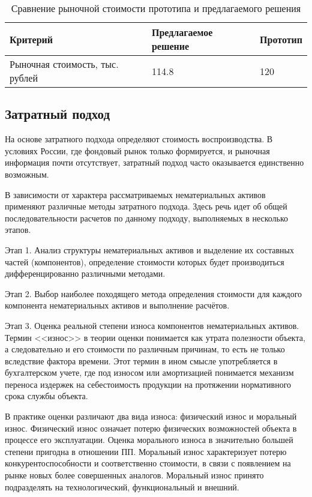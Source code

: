 \begin{table}[H]
\centering
\caption{Сравнение рыночной стоимости прототипа и предлагаемого решения}
{\small 
\begin{tabu}to \textwidth{ | X[c] | X[c] | X[c] | }
	\hline
    Критерий      & Предлагаемое решение & Прототип  \\ \hline
    Рыночная стоимость, тыс. рублей & 114.8 & 120 \\ \hline
\end{tabu}
}
\label{tab:anal2}
\end{table} 

\subsection{Затратный подход}

На основе затратного подхода определяют стоимость воспроизводства. В условиях России, где фондовый рынок только формируется, и рыночная информация почти отсутствует, затратный подход часто оказывается единственно возможным. 

В зависимости от характера рассматриваемых нематериальных активов применяют различные методы затратного подхода. Здесь речь идет об общей последовательности расчетов по данному подходу, выполняемых в несколько этапов. 

Этап 1. Анализ структуры нематериальных активов и выделение их составных частей (компонентов), определение стоимости которых будет производиться дифференцированно различными методами.

Этап 2. Выбор наиболее походящего метода определения стоимости для каждого компонента нематериальных активов и выполнение расчётов.

Этап 3. Оценка реальной степени износа компонентов нематериальных активов. Термин <<износ>> в теории оценки понимается как утрата полезности объекта, а следовательно и его стоимости по различным причинам, то есть не только вследствие фактора времени. Этот термин в ином смысле употребляется в бухгалтерском учете, где под износом или амортизацией понимается механизм переноса издержек на себестоимость продукции на протяжении нормативного срока службы объекта. 

В практике оценки различают два вида износа: физический износ и моральный износ. Физический износ означает потерю физических возможностей объекта в процессе его эксплуатации. Оценка морального износа в значительно большей степени пригодна в отношении ПП. Моральный износ характеризует потерю конкурентоспособности и соответственно стоимости, в связи с появлением на рынке новых более совершенных аналогов. Моральный износ принято подразделять на технологический, функциональный и внешний.

